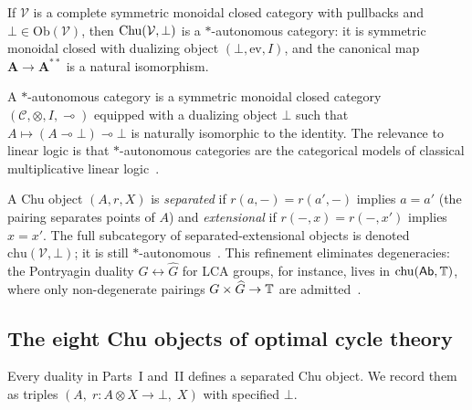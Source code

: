 \begin{theorem}
\label{thm:chu-star-auto}
If $\mathcal{V}$ is a complete symmetric monoidal closed category with
pullbacks and $\bot \in \mathrm{Ob}(\mathcal{V})$, then
$\mathrm{Chu}(\mathcal{V}, \bot)$ is a $*$-autonomous category: it is
symmetric monoidal closed with dualizing object
$(\bot, \mathrm{ev}, I)$, and the canonical map
$\mathbf{A} \to \mathbf{A}^{**}$ is a natural isomorphism.
\end{theorem}

A $*$-autonomous category is a symmetric monoidal closed category
$(\mathcal{C}, \otimes, I, \multimap)$ equipped with a dualizing object
$\bot$ such that $A \mapsto (A \multimap \bot) \multimap \bot$ is
naturally isomorphic to the identity.
The relevance to linear logic is that $*$-autonomous categories are
the categorical models of classical multiplicative linear
logic~\cite{Seely1989,Girard}.

\begin{remark}
\label{rmk:sep-ext}
A Chu object $(A, r, X)$ is \emph{separated} if
$r(a, -) = r(a', -)$ implies $a = a'$
(the pairing separates points of $A$) and \emph{extensional} if
$r(-, x) = r(-, x')$ implies $x = x'$.
The full subcategory of separated-extensional objects is denoted
$\mathrm{chu}(\mathcal{V}, \bot)$; it is still
$*$-autonomous~\cite[Theorem~4.1(7)]{BarrOmatt}.
This refinement eliminates degeneracies: the Pontryagin duality
$G \leftrightarrow \widehat{G}$ for LCA groups, for instance, lives in
$\mathrm{chu}(\mathsf{Ab}, \mathbb{T})$, where only non-degenerate pairings
$G \times \widehat{G} \to \mathbb{T}$ are
admitted~\cite[Example~5.3]{BarrOmatt}.
\end{remark}

\subsection*{The eight Chu objects of optimal cycle theory}

Every duality in Parts~I and~II defines a separated Chu object.
We record them as triples
$(A,\; r \colon A \otimes X \to \bot,\; X)$ with specified
$\bot$.

